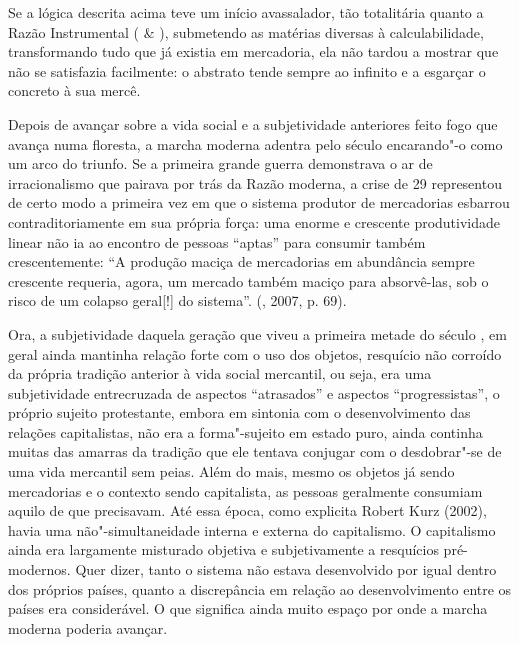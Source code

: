 Se a lógica descrita acima teve um início avassalador, tão totalitária
quanto a Razão Instrumental ( \& ), submetendo as
matérias diversas à calculabilidade, transformando
tudo que já existia em mercadoria, ela não tardou a mostrar que não se
satisfazia facilmente: o abstrato tende sempre ao infinito e a esgarçar
o concreto à sua mercê.

Depois de avançar sobre a vida social e a subjetividade anteriores feito
fogo que avança numa floresta, a marcha moderna adentra pelo século 
encarando"-o como um arco do triunfo. Se a primeira grande guerra
demonstrava o ar de irracionalismo que pairava por trás da Razão
moderna, a crise de 29 representou de certo modo a primeira vez em que o
sistema produtor de mercadorias esbarrou contraditoriamente em sua
própria força: uma enorme e crescente produtividade linear não ia ao
encontro de pessoas ``aptas'' para consumir também crescentemente: ``A
produção maciça de mercadorias em abundância sempre crescente requeria,
agora, um mercado também maciço para absorvê-las, sob o risco de um
colapso geral[!] do sistema''. (, 2007, p. 69).

Ora, a subjetividade daquela geração que viveu a primeira metade do
século , em geral ainda mantinha relação forte com o uso dos objetos,
resquício não corroído da própria tradição anterior à vida social
mercantil, ou seja, era uma subjetividade entrecruzada de aspectos
``atrasados'' e aspectos ``progressistas'', o próprio sujeito
protestante, embora em sintonia com o desenvolvimento das relações
capitalistas, não era a forma"-sujeito em estado puro, ainda continha
muitas das amarras da tradição que ele tentava conjugar com o
desdobrar"-se de uma vida mercantil sem peias. Além do mais, mesmo os
objetos já sendo mercadorias e o contexto sendo capitalista, as pessoas
geralmente consumiam aquilo de que precisavam. Até essa época, como
explicita Robert Kurz (2002), havia uma não"-simultaneidade interna e
externa do capitalismo. O capitalismo ainda era largamente misturado
objetiva e subjetivamente a resquícios pré-modernos. Quer dizer, tanto o
sistema não estava desenvolvido por igual dentro dos próprios países,
quanto a discrepância em relação ao desenvolvimento entre os países era
considerável. O que significa ainda muito espaço por onde a marcha
moderna poderia avançar.

